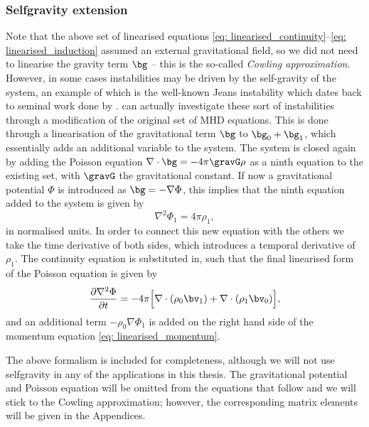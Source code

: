 \subsubsection{Selfgravity extension}
Note that the above set of linearised equations \eqref{eq: linearised_continuity}--\eqref{eq: linearised_induction} assumed an external gravitational field, so we did not need to linearise the gravity term $\bg$ -- this is the so-called \emph{Cowling approximation}. However, in some cases instabilities may be driven by the self-gravity of the system, an example of which is the well-known Jeans instability which dates back to seminal work done by \citet{book_jeans}. {\legolas} can actually investigate these sort of instabilities through a modification of the original set of MHD equations. This is done through a linearisation of the gravitational term $\bg$ to $\bg_0 + \bg_1$, which essentially adds an additional variable to the system. The system is closed again by adding the Poisson equation $\nabla \cdot \bg = -4\pi \gravG \rho$ as a ninth equation to the existing set, with $\gravG$ the gravitational constant. If now a gravitational potential $\Phi$ is introduced as $\bg = -\nabla \Phi$, this implies that the ninth equation added to the system is given by
\begin{equation}
  \nabla^2\Phi_1 = 4\pi\rho_1,
\end{equation}
in normalised units. In order to connect this new equation with the others we take the time derivative of both sides, which introduces a temporal derivative of $\rho_1$. The continuity equation is substituted in, such that the final linearised form of the Poisson equation is given by
\begin{equation}
  \frac{\partial \nabla^2 \Phi}{\partial t} =
    -4\pi \Bigl[\nabla \cdot \left(\rho_0 \bv_1\right) + \nabla \cdot \left(\rho_1 \bv_0\right)\Bigr],
\end{equation}
and an additional term $-\rho_0 \nabla \Phi_1$ is added on the right hand side of the momentum equation \eqref{eq: linearised_momentum}.

The above formalism is included for completeness, although we will not use selfgravity in any of the applications in this thesis. The gravitational potential and Poisson equation will be omitted from the equations that follow and we will stick to the Cowling approximation; however, the corresponding matrix elements will be given in the Appendices.

